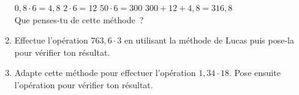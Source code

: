 \begin{activite}
\begin{partie}
\begin{enumerate}
 $0,8 \cdot 6 = 4,8$ \hfill $2 \cdot 6 = 12$ \hfill $50 \cdot 6 = 300$ \hfill $300 + 12 + 4,8 = 316,8$ \\[-1em]
 
 Que penses‑tu de cette méthode ?
 \item Effectue l'opération $763,6 \cdot 3$ en utilisant la méthode de Lucas puis pose‑la pour vérifier ton résultat.
 \item Adapte cette méthode pour effectuer l'opération $1,34 \cdot 18$. Pose ensuite l'opération pour vérifier ton résultat.
 \end{enumerate}
\end{partie}

\end{activite}





